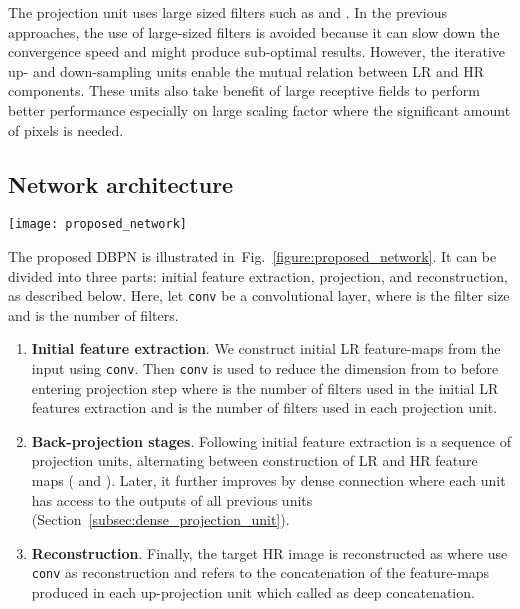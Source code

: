 \documentclass[10pt,journal,compsoc]{IEEEtran}
\begin{document}
The projection unit uses large sized filters such as  and . In the previous approaches, the use of large-sized filters is avoided because it can slow down the convergence speed and might produce sub-optimal results. 
However, the iterative up- and down-sampling units enable the mutual relation between LR and HR components.
These units also take benefit of large receptive fields to perform better performance especially on large scaling factor where the significant amount of pixels is needed.

\subsection{Network architecture}
\label{subsec:network architecture}
\begin{figure*}[t!]
\centering
\texttt{[image: proposed\_network]}\vspace{-1.5em}
\caption{An implementation of DBPN for super-resolution which exploits densely connected projection unit to encourage feature reuse.}
\label{figure:proposed_network}
\end{figure*}

The proposed DBPN is illustrated in~Fig.~\ref{figure:proposed_network}. It can be divided into three
parts: initial feature extraction, projection, and reconstruction, as
described below. Here, let \texttt{conv} be a convolutional layer,
where  is the filter size and  is the number of filters. 

\begin{enumerate}
\item \textbf{Initial feature extraction}. We construct initial LR
  feature-maps  from the input using \texttt{conv}. 
  Then \texttt{conv} is used to reduce the dimension from  to  before
  entering projection step where  is the number of filters used in the initial LR features extraction and  is the number of filters used in each projection unit.
\item \textbf{Back-projection stages}. Following initial feature
  extraction is a sequence of projection units, alternating between
  construction of LR and HR feature maps ( and ).
  Later, it further improves by dense connection where each unit has access to the outputs of all previous units (Section~\ref{subsec:dense_projection_unit}).

\item \textbf{Reconstruction}. Finally, the target HR image is
  reconstructed as  where  use \texttt{conv} as
  reconstruction and  refers to the concatenation of the feature-maps
  produced in each up-projection unit which called as deep concatenation.
\end{enumerate}
\end{document}
